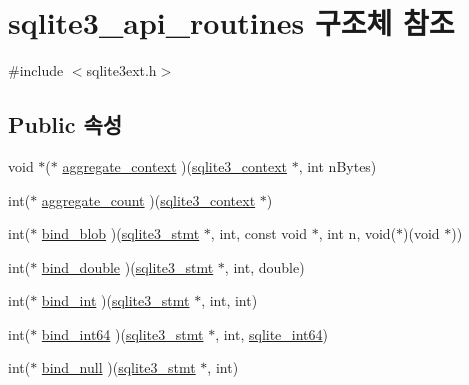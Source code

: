 \hypertarget{structsqlite3__api__routines}{}\section{sqlite3\+\_\+api\+\_\+routines 구조체 참조}
\label{structsqlite3__api__routines}


{\ttfamily \#include $<$sqlite3ext.\+h$>$}

\subsection*{Public 속성}
\begin{DoxyCompactItemize}
\item 
void $\ast$($\ast$ \hyperlink{structsqlite3__api__routines_a9ab2057c3042c5136b05f7daab66b4f4}{aggregate\+\_\+context} )(\hyperlink{sqlite3_8h_a3b519553ffec8fc42b2356f5b1ebdc57}{sqlite3\+\_\+context} $\ast$, int n\+Bytes)
\item 
int($\ast$ \hyperlink{structsqlite3__api__routines_aa2f39986a5de8ec01fb5cb2aa573c08d}{aggregate\+\_\+count} )(\hyperlink{sqlite3_8h_a3b519553ffec8fc42b2356f5b1ebdc57}{sqlite3\+\_\+context} $\ast$)
\item 
int($\ast$ \hyperlink{structsqlite3__api__routines_a2e84de4afd1ba42151a75df4d7480a72}{bind\+\_\+blob} )(\hyperlink{sqlite3_8h_af2a033da1327cdd77f0a174a09aedd0c}{sqlite3\+\_\+stmt} $\ast$, int, const void $\ast$, int n, void($\ast$)(void $\ast$))
\item 
int($\ast$ \hyperlink{structsqlite3__api__routines_abcdefbe78ab3ce4324d86651c03e8470}{bind\+\_\+double} )(\hyperlink{sqlite3_8h_af2a033da1327cdd77f0a174a09aedd0c}{sqlite3\+\_\+stmt} $\ast$, int, double)
\item 
int($\ast$ \hyperlink{structsqlite3__api__routines_a70b6cc78957f11ff206df6125973daea}{bind\+\_\+int} )(\hyperlink{sqlite3_8h_af2a033da1327cdd77f0a174a09aedd0c}{sqlite3\+\_\+stmt} $\ast$, int, int)
\item 
int($\ast$ \hyperlink{structsqlite3__api__routines_ac71b110c165973291cc257973e7d6243}{bind\+\_\+int64} )(\hyperlink{sqlite3_8h_af2a033da1327cdd77f0a174a09aedd0c}{sqlite3\+\_\+stmt} $\ast$, int, \hyperlink{sqlite3_8h_a520a95f9080c018b2fade39885bd2e2a}{sqlite\+\_\+int64})
\item 
int($\ast$ \hyperlink{structsqlite3__api__routines_a78d546c352de656db3c15e7cc6255228}{bind\+\_\+null} )(\hyperlink{sqlite3_8h_af2a033da1327cdd77f0a174a09aedd0c}{sqlite3\+\_\+stmt} $\ast$, int)

\end{DoxyCompactItemize}

